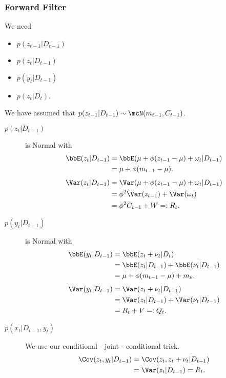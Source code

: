 \documentclass{article}
\begin{document}
\subsubsection{Forward Filter}

We need
\begin{itemize}
\item $p(z_{t-1} | D_{t-1})$
\item $p(z_{t} | D_{t-1})$
\item $p(y_t | D_{t-1})$
\item $p(z_t | D_t)$.
\end{itemize}
We have assumed that $p(z_{t-1} | D_{t-1}) \sim \mcN(m_{t-1}, C_{t-1})$.

\begin{description}

\item[$p(z_t | D_{t-1})$] is Normal with
\begin{align*}
\bbE ( z_t | D_{t-1} ) 
& = \bbE( \mu + \phi(z_{t-1} - \mu) + \omega_t| D_{t-1}) \\
& = \mu + \phi (m_{t-1} - \mu).
\end{align*}
\begin{align*}
\Var(z_t | D_{t-1}) 
& = \Var(\mu + \phi (z_{t-1} - \mu) + \omega_t | D_{t-1}) \\
& = \phi^2 \Var(z_{t-1}) + \Var (\omega_t) \\
& = \phi^2 C_{t-1} + W =: R_t.
\end{align*}

\item[$p(y_t | D_{t-1})$] is Normal with
\begin{align*}
\bbE( y_t | D_{t-1}) 
& = \bbE (z_t + \nu_t | D_t) \\
& = \bbE (z_t | D_{t-1}) + \bbE(\nu_t | D_{t-1}) \\
& = \mu + \phi (m_{t-1} - \mu) + m_\nu.
\end{align*}
\begin{align*}
\Var(y_t | D_{t-1}) 
& = \Var (z_t + \nu_t | D_{t-1}) \\
& = \Var (z_t | D_{t-1}) + \Var(\nu_t | D_{t-1}) \\
& = R_t + V =: Q_t.
\end{align*}

\item[$p(x_t | D_{t-1}, y_t)$]  We use our conditional - joint - conditional trick.
\begin{align*}
\Cov (z_t, y_t | D_{t-1}) 
& = \Cov( z_t, z_t + \nu_t | D_{t-1}) \\
& = \Var (z_t | D_{t-1}) = R_t.
\end{align*}


\end{description}
\end{document}
